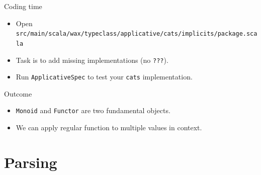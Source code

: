 \documentclass[presentation,aspectratio=169,smaller]{beamer}
\begin{document}
\begin{frame}[label={sec:orgf1f8029},fragile]{Coding time}
 \begin{itemize}
\item Open \texttt{src/main/scala/wax/typeclass/applicative/cats/implicits/package.scala}
\item Task is to add missing implementations (no \texttt{???}).
\item Run \texttt{ApplicativeSpec} to test your \texttt{cats} implementation.
\end{itemize}
\end{frame}

\begin{frame}[label={sec:org1252fcc},fragile]{Outcome}
 \begin{itemize}
\item <1-> \texttt{Monoid} and \texttt{Functor} are two fundamental objects.
\item <2-> We can apply regular function to multiple values in context.
\end{itemize}
\end{frame}

\section{Parsing}
\label{sec:org386fd34}
\end{document}
